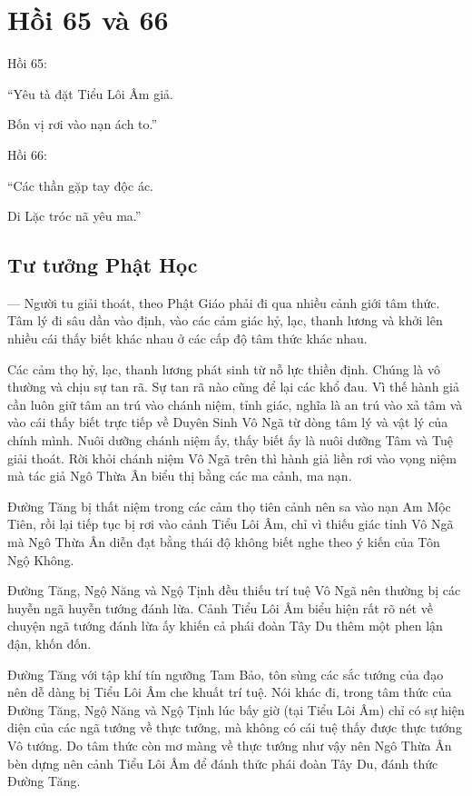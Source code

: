 \chapter{Hồi 65 và 66} %
\label{cha:hoi_65_66}

Hồi 65:

\begin{itshape}
``Yêu tà đặt Tiểu Lôi Âm giả.

Bốn vị rơi vào nạn ách to.''
\end{itshape}

Hồi 66:

\begin{itshape}
``Các thần gặp tay độc ác.

Di Lặc tróc nã yêu ma.''
\end{itshape}

\section{Tư tưởng Phật Học} %
\label{sec:65_66_phat_hoc}

--- Người tu giải thoát, theo Phật Giáo phải đi qua nhiều cảnh giới tâm thức. Tâm lý đi sâu dần vào định, vào các cảm giác hỷ, lạc, thanh lương và khởi lên nhiều cái thấy biết khác nhau ở các cấp độ tâm thức khác nhau.

Các cảm thọ hỷ, lạc, thanh lương phát sinh từ nỗ lực thiền định. Chúng là vô thường và chịu sự tan rã. Sự tan rã nào cũng để lại các khổ đau. Vì thế hành giả cần luôn giữ tâm an trú vào chánh niệm, tỉnh giác, nghĩa là an trú vào xả tâm và vào cái thấy biết trực tiếp về Duyên Sinh Vô Ngã từ dòng tâm lý và vật lý của chính mình. Nuôi dưỡng chánh niệm ấy, thấy biết ấy là nuôi dưỡng Tâm và Tuệ giải thoát. Rời khỏi chánh niệm Vô Ngã trên thì hành giả liền rơi vào vọng niệm mà tác giả Ngô Thừa Ân biểu thị bằng các ma cảnh, ma nạn.

Đường Tăng bị thất niệm trong các cảm thọ tiên cảnh nên sa vào nạn Am Mộc Tiên, rồi lại tiếp tục bị rơi vào cảnh Tiểu Lôi Âm, chỉ vì thiếu giác tỉnh Vô Ngã mà Ngô Thừa Ân diễn đạt bằng thái độ không biết nghe theo ý kiến của Tôn Ngộ Không.

Đường Tăng, Ngộ Năng và Ngộ Tịnh đều thiếu trí tuệ Vô Ngã nên thường bị các huyễn ngã huyễn tướng đánh lừa. Cảnh Tiểu Lôi Âm biểu hiện rất rõ nét về chuyện ngã tướng đánh lừa ấy khiến cả phái đoàn Tây Du thêm một phen lận đận, khốn đốn.

Đường Tăng với tập khí tín ngưỡng Tam Bảo, tôn sùng các sắc tướng của đạo nên dễ dàng bị Tiểu Lôi Âm che khuất trí tuệ. Nói khác đi, trong tâm thức của Đường Tăng, Ngộ Năng và Ngộ Tịnh lúc bấy giờ (tại Tiểu Lôi Âm) chỉ có sự hiện diện của các ngã tướng về thực tướng, mà không có cái tuệ thấy được thực tướng Vô tướng. Do tâm thức còn mơ màng về thực tướng như vậy nên Ngô Thừa Ân bèn dựng nên cảnh Tiểu Lôi Âm để đánh thức phái đoàn Tây Du, đánh thức Đường Tăng.

